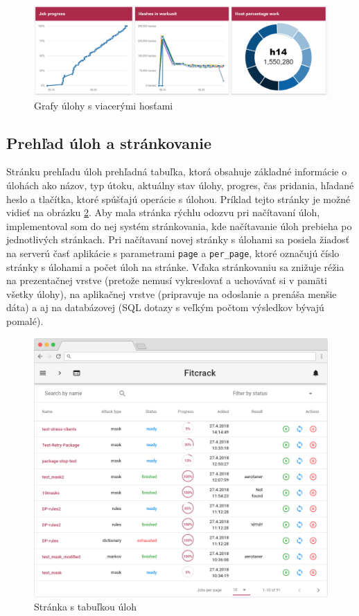 \documentclass[slovak]{fitthesis}
\begin{document}
\begin{figure}[H]
    \centering
    \includegraphics[scale=0.56]{obrazky/graf2.PNG}
    \caption{Grafy úlohy s viacerými hosťami}
    \label{fig:graf2}
\end{figure}

\subsection{Prehľad úloh a stránkovanie}
Stránku prehľadu úloh prehľadná tabuľka, ktorá obsahuje základné informácie o úlohách ako názov, typ útoku, aktuálny stav úlohy, progres, čas pridania, hľadané heslo a tlačítka, ktoré spúšťajú operácie s úlohou. Príklad tejto stránky je možné vidieť na obrázku \ref{fig:jobsPage}. Aby mala stránka rýchlu odozvu pri načítavaní úloh, implementoval som do nej systém stránkovania, kde načítavanie úloh prebieha po jednotlivých stránkach. Pri načítavaní novej stránky s úlohami sa posiela žiadosť na serverú časť aplikácie s parametrami \texttt{page} a \texttt{per\_page}, ktoré označujú číslo stránky s úlohami a počet úloh na stránke. Vďaka stránkovaniu sa znižuje réžia na prezentačnej vrstve (pretože nemusí vykreslovať a uchovávať si v pamäti všetky úlohy), na aplikačnej vrstve (pripravuje na odoslanie a prenáša menšie dáta) a aj na databázovej (SQL dotazy s veľkým počtom výsledkov bývajú pomalé).
\begin{figure}[H]
    \centering
    \includegraphics[scale=0.46]{obrazky/jobsFrame2.PNG}
    \caption{Stránka s tabuľkou úloh}
    \label{fig:jobsPage}
\end{figure}
\end{document}
